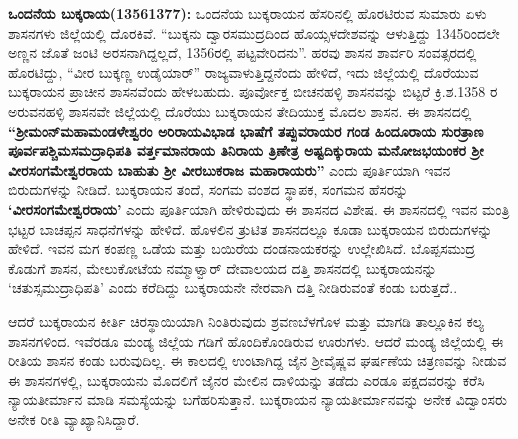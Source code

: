 \textbf{ ಒಂದನೆಯ ಬುಕ್ಕರಾಯ(13561377):} ಒಂದನೆಯ ಬುಕ್ಕರಾಯನ ಹೆಸರಿನಲ್ಲಿ ಹೊರಟಿರುವ ಸುಮಾರು ಏಳು ಶಾಸನಗಳು ಜಿಲ್ಲೆಯಲ್ಲಿ ದೊರಕಿವೆ. “ಬುಕ್ಕನು ದ್ವಾರಸಮುದ್ರದಿಂದ ಹೊಯ್ಸಳದೇಶವನ್ನು ಆಳುತ್ತಿದ್ದು 1345ರಿಂದಲೇ ಅಣ್ಣನ ಜೊತೆ ಜಂಟಿ ಅರಸನಾಗಿದ್ದಲ್ಲದೆ, 1356ರಲ್ಲಿ ಪಟ್ಟವೇರಿದನು”. ಹರವು ಶಾಸನ ಶಾರ್ವರಿ ಸಂವತ್ಸರದಲ್ಲಿ ಹೊರಟಿದ್ದು, “ವೀರ ಬುಕ್ಕಣ್ಣ ಉಡೈಯಾರ್​” ರಾಜ್ಯವಾಳುತ್ತಿದ್ದನೆಂದು ಹೇಳಿದೆ, ಇದು ಜಿಲ್ಲೆಯಲ್ಲಿ ದೊರೆಯುವ ಬುಕ್ಕರಾಯನ ಪ್ರಾಚೀನ ಶಾಸನವೆಂದು ಹೇಳಬಹುದು. ಪೂರ್ವೋಕ್ತ ಬೀಚನಹಳ್ಳಿ ಶಾಸನವನ್ನು ಬಿಟ್ಟರೆ ಕ್ರಿ.ಶ.1358 ರ ಅರುವನಹಳ್ಳಿ ಶಾಸನವೇ ಜಿಲ್ಲೆಯಲ್ಲಿ ದೊರೆಯು ಬುಕ್ಕರಾಯನ ತೇದಿಯುಕ್ತ ಮೊದಲ ಶಾಸನ. ಈ ಶಾಸನದಲ್ಲಿ \textbf{“ಶ‍್ರೀಮಂನ್​ ಮಹಾಮಂಡಳೇಶ್ವರಂ ಅರಿರಾಯವಿಭಾಡ ಭಾಷೆಗೆ ತಪ್ಪುವರಾಯರ ಗಂಡ ಹಿಂದೂರಾಯ ಸುರತ್ರಾಣ ಪೂರ್ವಪಶ್ಚಿಮಸಮದ್ರಾಧಿಪತಿ\general{\break } ವರ್ತ್ತಮಾನರಾಯ ತಿನಿರಾಯ ತ್ರಿಣೇತ್ರ ಅಷ್ಟದಿಕ್ಕುರಾಯ ಮನೋಜಭಯಂಕರ ಶ‍್ರೀ ವೀರಸಂಗಮೇಶ್ವರರಾಯ ಬಾಹುತು ಶ‍್ರೀ ವೀರಬುಕರಾಜ ಮಹಾರಾಯರು”} ಎಂದು ಪೂರ್ತಿಯಾಗಿ ಇವನ ಬಿರುದುಗಳನ್ನು ನೀಡಿದೆ. ಬುಕ್ಕರಾಯನ ತಂದೆ, ಸಂಗಮ ವಂಶದ ಸ್ಥಾಪಕ, ಸಂಗಮನ ಹೆಸರನ್ನು \textbf{‘ವೀರಸಂಗಮೇಶ್ವರರಾಯ’} ಎಂದು ಪೂರ್ತಿಯಾಗಿ ಹೇಳಿರುವುದು ಈ ಶಾಸನದ ವಿಶೇಷ. ಈ ಶಾಸನದಲ್ಲಿ ಇವನ ಮಂತ್ರಿ ಭಟ್ಟರ ಬಾಚಪ್ಪನ ಸಾಧನೆಗಳನ್ನು ಹೇಳಿದೆ. ಹೊಳಲಿನ ತ್ರುಟಿತ ಶಾಸನದಲ್ಲೂ ಕೂಡಾ ಬುಕ್ಕರಾಯನ ಬಿರುದುಗಳನ್ನು ಹೇಳಿದೆ. ಇವನ ಮಗ ಕಂಪಣ್ಣ ಒಡೆಯ ಮತ್ತು ಬಯಿರೆಯ ದಂಡನಾಯಕರನ್ನು ಉಲ್ಲೇಖಿಸಿದೆ. ಬೊಪ್ಪಸಮುದ್ರ ಕೊಡುಗೆ ಶಾಸನ, ಮೇಲುಕೋಟೆಯ ನಮ್ಮಾಳ್ವಾರ್​ ದೇವಾಲಯದ ದತ್ತಿ ಶಾಸನದಲ್ಲಿ ಬುಕ್ಕರಾಯನನ್ನು `ಚತುಸ್ಸಮುದ್ರಾಧಿಪತಿ' ಎಂದು ಕರೆದಿದ್ದು ಬುಕ್ಕರಾಯನೇ ನೇರವಾಗಿ ದತ್ತಿ ನೀಡಿರುವಂತೆ ಕಂಡು ಬರುತ್ತದೆ.. 

ಆದರೆ ಬುಕ್ಕರಾಯನ ಕೀರ್ತಿ ಚಿರಸ್ಥಾಯಿಯಾಗಿ ನಿಂತಿರುವುದು ಶ್ರವಣಬೆಳಗೊಳ ಮತ್ತು ಮಾಗಡಿ ತಾಲ್ಲೂಕಿನ ಕಲ್ಯ ಶಾಸನಗಳಿಂದ. ಇವೆರಡೂ ಮಂಡ್ಯ ಜಿಲ್ಲೆಯ ಗಡಿಗೆ ಹೊಂದಿಕೊಂಡಿರುವ ಊರುಗಳು. ಆದರೆ ಮಂಡ್ಯ ಜಿಲ್ಲೆಯಲ್ಲಿ ಈ ರೀತಿಯ ಶಾಸನ ಕಂಡು ಬರುವುದಿಲ್ಲ. ಈ ಕಾಲದಲ್ಲಿ ಉಂಟಾಗಿದ್ದ ಜೈನ ಶ‍್ರೀವೈಷ್ಣವ ಘರ್ಷಣೆಯ ಚಿತ್ರಣವನ್ನು ನೀಡುವ ಈ ಶಾಸನಗಳಲ್ಲಿ, ಬುಕ್ಕರಾಯನು ಮೊದಲಿಗೆ ಜೈನರ ಮೇಲಿನ ದಾಳಿಯನ್ನು ತಡೆದು ಎರಡೂ ಪಕ್ಷದವರನ್ನು ಕರೆಸಿ ನ್ಯಾಯತೀರ್ಮಾನ ಮಾಡಿ ಸಮಸ್ಯೆಯನ್ನು ಬಗೆಹರಿಸುತ್ತಾನೆ. ಬುಕ್ಕರಾಯನ ನ್ಯಾಯತೀರ್ಮಾನವನ್ನು ಅನೇಕ ವಿದ್ವಾಂಸರು ಅನೇಕ ರೀತಿ ವ್ಯಾಖ್ಯಾನಿಸಿದ್ದಾರೆ.


